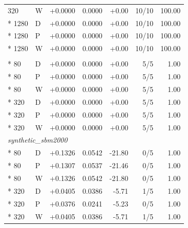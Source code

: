 \begin{longtable}{llrrrrr}
320 & W & +0.0000 & 0.0000 & +0.00 & 10/10 & 100.00\\*
1280 & D & +0.0000 & 0.0000 & +0.00 & 10/10 & 100.00\\*
1280 & P & +0.0000 & 0.0000 & +0.00 & 10/10 & 100.00\\*
1280 & W & +0.0000 & 0.0000 & +0.00 & 10/10 & 100.00\\
\pagebreak[4]
\multicolumn{7}{l}{\textit{synthetic\_ba2000}}\\*
80 & D & +0.0000 & 0.0000 & +0.00 & 5/5 & 1.00\\*
80 & P & +0.0000 & 0.0000 & +0.00 & 5/5 & 1.00\\*
80 & W & +0.0000 & 0.0000 & +0.00 & 5/5 & 1.00\\*
320 & D & +0.0000 & 0.0000 & +0.00 & 5/5 & 1.00\\*
320 & P & +0.0000 & 0.0000 & +0.00 & 5/5 & 1.00\\*
320 & W & +0.0000 & 0.0000 & +0.00 & 5/5 & 1.00\\
\multicolumn{7}{l}{\textit{synthetic\_sbm2000}}\\*
80 & D & +0.1326 & 0.0542 & -21.80 & 0/5 & 1.00\\*
80 & P & +0.1307 & 0.0537 & -21.46 & 0/5 & 1.00\\*
80 & W & +0.1326 & 0.0542 & -21.80 & 0/5 & 1.00\\*
320 & D & +0.0405 & 0.0386 & -5.71 & 1/5 & 1.00\\*
320 & P & +0.0376 & 0.0241 & -5.23 & 0/5 & 1.00\\*
320 & W & +0.0405 & 0.0386 & -5.71 & 1/5 & 1.00\\
\end{longtable}
